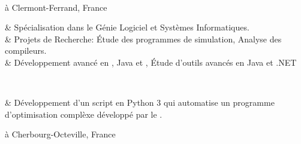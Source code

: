 	{\\ à Clermont-Ferrand, France}

\begin{cvstate}
	\begin{cvtable}{2.5ex}
		{\tiny {}} & Spécialisation dans le Génie Logiciel et Systèmes Informatiques.\\
		{\tiny {}} & Projets de Recherche: Étude des programmes de simulation, Analyse des compileurs.\\
		{\tiny {}} & Développement avancé en \cplusplus, Java et \csharp, Étude d'outils avancés en Java et .NET\\
	\end{cvtable}

	\\
	\begin{cvtable}{2.5ex}
			{\tiny {}} & Développement d'un script en Python 3 qui automatise un programme d'optimisation complèxe développé par le .
	\end{cvtable}
\end{cvstate}

	{ à Cherbourg-Octeville, France}

\vspace{0.2cm}
